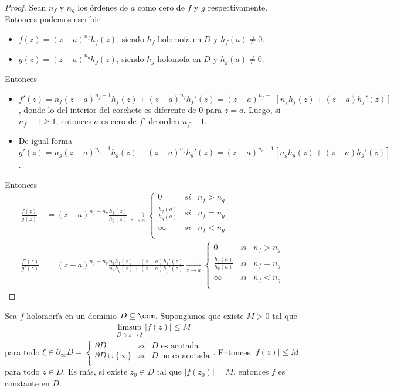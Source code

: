 \begin{proof}
Sean $n_f$ y $n_g$ los órdenes de $a$ como cero de $f$ y $g$ respectivamente. Entonces podemos escribir
\begin{itemize}
    \item $f(z) = (z-a)^{n_f}h_f(z)$, siendo $h_f$ holomofa en $D$ y $h_f(a) \not = 0$.
    \item $g(z) = (z-a)^{n_g}h_g(z)$, siendo $h_g$ holomofa en $D$ y $h_g(a) \not = 0$.
\end{itemize}
Entonces
\begin{itemize}
    \item $f'(z) = n_f(z-a)^{n_f -1}h_f(z) + (z-a)^{n_f}h_f'(z) = (z-a)^{n_f -1}[n_fh_f(z) + (z-a)h_f'(z)]$, donde lo del interior del corchete es diferente de 0 para $z = a$. Luego, si $n_f -1 \ge 1$, entonces $a$ es cero de $f'$ de orden $n_f -1$.
    \item De igual forma $g'(z) = n_g(z-a)^{n_g -1}h_g(z) + (z-a)^{n_g}h_g'(z) = (z-a)^{n_g -1}[n_gh_g(z) + (z-a)h_g'(z)]$.
\end{itemize}
Entonces
\begin{align*}
    \frac{f(z)}{g(z)} &= (z-a)^{n_f - n_g} \frac{h_f(z)}{h_g(z)} \xrightarrow[z \to a]{} \left\{ \begin{array}{lcc}
             0 &  si  & n_f > n_g\\
             \frac{h_f(a)}{h_g(a)} &  si & n_f = n_g \\
             \infty &  si  & n_f < n_g\\
             \end{array}
   \right. \\
   \frac{f'(z)}{g'(z)} &= (z-a)^{n_f - n_g} \frac{n_fh_f(z) + (z-a)h_f'(z)}{n_gh_g(z) + (z-a)h_g'(z)} \xrightarrow[z \to a]{} \left\{ \begin{array}{lcc}
             0 &  si  & n_f > n_g\\
             \frac{h_f(a)}{h_g(a)} &  si & n_f = n_g \\
             \infty &  si  & n_f < n_g\\
             \end{array}
   \right.
\end{align*}
\end{proof}

\begin{teo}
Sea $f$ holomorfa en un dominio $D \subseteq \com$. Supongamos que existe $M > 0$ tal que
\begin{align*}
    \limsup_{D \ni z \to \xi} |f(z)| \leq M
\end{align*}
para todo $\xi \in \partial_{\infty} D = \left\{ \begin{array}{lcc}
             \partial D &  si  & D \text{ es acotada}\\
             \partial D \cup \{\infty\} &  si & D \text{ no es acotada} \\
             \end{array}
   \right.$. Entonces $|f(z)| \leq M$ para todo $z \in D$. Es más, si existe $z_0 \in D$ tal que $|f(z_0)| = M$, entonces $f$ es constante en $D$.
\end{teo}

